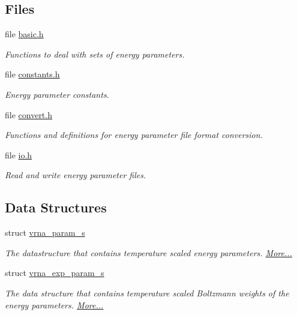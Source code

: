 \subsection*{Files}
\begin{DoxyCompactItemize}
\item 
file \mbox{\hyperlink{params_2basic_8h}{basic.\+h}}
\begin{DoxyCompactList}\small\item\em Functions to deal with sets of energy parameters. \end{DoxyCompactList}\item 
file \mbox{\hyperlink{constants_8h}{constants.\+h}}
\begin{DoxyCompactList}\small\item\em Energy parameter constants. \end{DoxyCompactList}\item 
file \mbox{\hyperlink{convert_8h}{convert.\+h}}
\begin{DoxyCompactList}\small\item\em Functions and definitions for energy parameter file format conversion. \end{DoxyCompactList}\item 
file \mbox{\hyperlink{io_8h}{io.\+h}}
\begin{DoxyCompactList}\small\item\em Read and write energy parameter files. \end{DoxyCompactList}\end{DoxyCompactItemize}
\subsection*{Data Structures}
\begin{DoxyCompactItemize}
\item 
struct \mbox{\hyperlink{group__energy__parameters_structvrna__param__s}{vrna\+\_\+param\+\_\+s}}
\begin{DoxyCompactList}\small\item\em The datastructure that contains temperature scaled energy parameters.  \mbox{\hyperlink{group__energy__parameters_structvrna__param__s}{More...}}\end{DoxyCompactList}\item 
struct \mbox{\hyperlink{group__energy__parameters_structvrna__exp__param__s}{vrna\+\_\+exp\+\_\+param\+\_\+s}}
\begin{DoxyCompactList}\small\item\em The data structure that contains temperature scaled Boltzmann weights of the energy parameters.  \mbox{\hyperlink{group__energy__parameters_structvrna__exp__param__s}{More...}}\end{DoxyCompactList}\end{DoxyCompactItemize}
